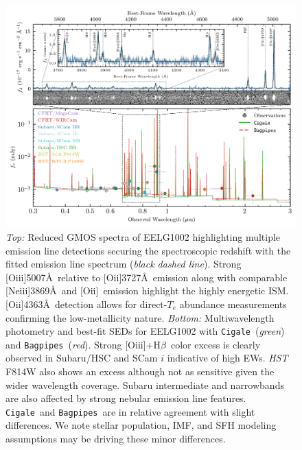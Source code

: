 \documentclass[twocolumn,tight,times,linenumbers]{aastex631}
\newcommand{\hbeta}{H$\beta$}
\newcommand{\oii}{[O{\sc ii}]}
\newcommand{\oiii}{[O{\sc iii}]}
\newcommand{\neiii}{[Ne{\sc iii}]}
\newcommand{\cigale}{\texttt{Cigale}}
\newcommand{\bagpipes}{\texttt{Bagpipes}}
\begin{document}
		\begin{figure}
			\centering
			\includegraphics[width=\textwidth]{figures/EELG1002_SED.png}
			\caption{\textit{Top:} Reduced GMOS spectra of EELG1002 highlighting multiple emission line detections securing the spectroscopic redshift with the fitted emission line spectrum (\textit{black dashed line}). Strong \oiii5007\AA~relative to \oii3727\AA~emission along with comparable \neiii3869\AA~and \oii~emission highlight the highly energetic ISM. \oii4363\AA~detection allows for direct-$T_e$ abundance measurements confirming the low-metallicity nature. \textit{Bottom:} Multiwavelength photometry and best-fit SEDs for EELG1002 with \cigale~(\textit{green}) and \bagpipes~(\textit{red}). Strong \oiii+\hbeta~color excess is clearly observed in Subaru/HSC and SCam $i$ indicative of high EWs. \textit{HST} F814W also shows an excess although not as sensitive given the wider wavelength coverage. Subaru intermediate and narrowbands are also affected by strong nebular emission line features. \cigale~and \bagpipes~are in relative agreement with slight differences. We note stellar population, IMF, and SFH modeling assumptions may be driving these minor differences.}
			\label{fig:spectra_and_sed}
		\end{figure}
	
\end{document}
